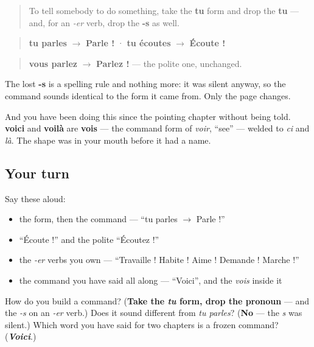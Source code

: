 \begin{cousinweb}
\begin{quote}
To tell somebody to do something, take the \textbf{tu} form and drop the \textbf{tu} — and, for an \emph{-er} verb, drop the \textbf{-s} as well.
\end{quote}

\begin{quote}
\textbf{tu parles} $\to$ \textbf{Parle !} · \textbf{tu écoutes} $\to$ \textbf{Écoute !}
\end{quote}

\begin{quote}
\textbf{vous parlez} $\to$ \textbf{Parlez !} — the polite one, unchanged.
\end{quote}

The lost \textbf{-s} is a spelling rule and nothing more: it was silent anyway, so the command sounds identical to the form it came from. Only the page changes.

And you have been doing this since the pointing chapter without being told. \textbf{voici} and \textbf{voilà} are \textbf{vois} — the command form of \emph{voir}, \textquotedblleft{}see\textquotedblright{} — welded to \emph{ci} and \emph{là}. The shape was in your mouth before it had a name.
\end{cousinweb}

\subsection*{Your turn}
Say these aloud:

\begin{itemize}
\raggedright
  \item the form, then the command — \textquotedblleft{}tu parles $\to$ Parle !\textquotedblright{}
  \item \textquotedblleft{}Écoute !\textquotedblright{} and the polite \textquotedblleft{}Écoutez !\textquotedblright{}
  \item the \emph{-er} verbs you own — \textquotedblleft{}Travaille ! Habite ! Aime ! Demande ! Marche !\textquotedblright{}
  \item the command you have said all along — \textquotedblleft{}Voici\textquotedblright{}, and the \emph{vois} inside it
\end{itemize}

\begin{tcolorbox}[breakable,colback=teal!4,colframe=teal!35!black,title={Before you move on}]
How do you build a command? (\textbf{Take the \emph{tu} form, drop the pronoun} — and the \emph{-s} on an \emph{-er} verb.) Does it sound different from \emph{tu parles}? (\textbf{No} — the \emph{s} was silent.) Which word you have said for two chapters is a frozen command? (\emph{\textbf{Voici}}.)
\end{tcolorbox}
